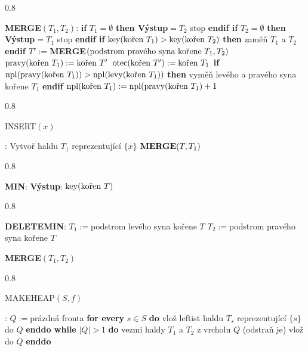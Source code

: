 \documentclass[a4paper,12pt]{article}
\DeclareMathOperator*{\otec}{otec}
\DeclareMathOperator*{\levy}{levy}
\DeclareMathOperator*{\pravy}{pravy}
\DeclareMathOperator*{\key}{key}
\DeclareMathOperator*{\npl}{npl}
\newcommand{\algoritmus}[1]{
  {
  \setlength\fboxrule{0.5pt}

  \begin{boxedminipage}{0.8\textwidth}

 #1
  \end{boxedminipage}

  }
  }
\begin{document}
\algoritmus{
{\bf MERGE$(T_1,T_2)$}:\newline 
{\bf \textsf{if}} $T_1=\emptyset$ {\bf \textsf{then} Výstup$=T_2$} \textsf{stop} {\bf \textsf{endif}\newline 
\textsf{if}} $T_2=\emptyset$ {\bf \textsf{then} Výstup$=T_1$} \textsf{stop} {\bf \textsf{endif}\newline 
\textsf{if}} $\key(\text{\rm kořen }T_1)>\key(\text{\rm kořen }T_2)$ {\bf \textsf{then}\newline 
\phantom{{\rm ---}}}zaměň $T_1$ a $T_2$\newline 
{\bf \textsf{endif}\newline 
$T':=$MERGE$(\text{{{\rm podstrom pravého syna kořene }}}T_1
,T_2)$\newline 
$\pravy(\text{\rm{{\rm kořen }}}T_1):=\text{\rm{{\rm kořen }}}
T'$\newline 
$\otec(\text{\rm {\rm kořen }}T'):=\text{\rm {\rm kořen }}T_
1$\newline 
\textsf{if}} $\npl(\pravy(\text{\rm kořen }T_1))>\npl(\levy(\text{\rm kořen }
T_1))$ {\bf \textsf{then}\newline 
\phantom{{\rm ---}}}vyměň levého a pravého syna kořene $
T_1$\newline 
{\bf \textsf{endif}\newline 
$\npl(\text{{\rm {\rm kořen }}}T_1):=\npl(\pravy(\text{{\rm {\rm kořen }}}
T_1)+1$
}}\algoritmus{{\bf

INSERT$(x)$}:\newline 
Vytvoř haldu $T_1$ reprezentující $\{x\}$\newline 
$\bold M\bold E\bold R\bold G\bold E(T,T_1)$
}\algoritmus{

{\bf MIN}:\newline 
{\bf Výstup}: $\key(\text{\rm kořen }T)$
}\algoritmus{

{\bf DELETEMIN}:\newline 
$T_1:=$podstrom levého syna kořene $T$\newline 
$T_2:=$podstrom pravého syna kořene $T$\newline 
{\bf MERGE$(T_1,T_2)$

}}\algoritmus{{\bf

MAKEHEAP$(S,f)$}:\newline 
$Q:=$prázdná fronta\newline 
{\bf \textsf{for every}} $s\in S$ {\bf \textsf{do}\newline 
\phantom{{\rm ---}}}vlož leftist haldu $T_s$ reprezentující $
\{s\}$ do $Q$\newline 
{\bf \textsf{enddo}\newline 
\textsf{while}} $|Q|>1$ {\bf \textsf{do}\newline 
\phantom{{\rm ---}}}vezmi haldy $T_1$ a $T_2$ z vrcholu $Q$ 
(odstraň je)\newline 
\phantom{---}{\bf MERGE$(T_1,T_2)$} vlož do $Q$\newline 
{\bf \textsf{enddo}
}}
\end{document}
